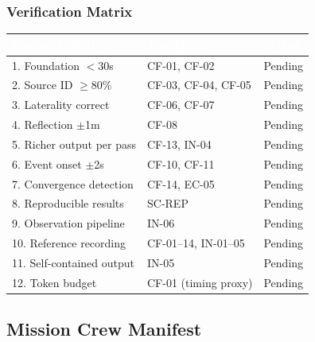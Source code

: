 \documentclass[11pt,letterpaper]{article}
\newcommand{\tableheader}[1]{\textbf{\sffamily\textcolor{white}{#1}}}
\begin{document}
\subsubsection{Verification Matrix}

\begin{center}
\begin{tabularx}{\textwidth}{XL{3.5cm}C{1.5cm}}
\toprule
{}
\tableheader{Success Criterion} & \tableheader{Test ID(s)} & \tableheader{Status} \\
. Foundation $<$30s & CF-01, CF-02 & Pending \\
2. Source ID $\geq$80\% & CF-03, CF-04, CF-05 & Pending \\
3. Laterality correct & CF-06, CF-07 & Pending \\
4. Reflection $\pm$1m & CF-08 & Pending \\
5. Richer output per pass & CF-13, IN-04 & Pending \\
6. Event onset $\pm$2s & CF-10, CF-11 & Pending \\
7. Convergence detection & CF-14, EC-05 & Pending \\
8. Reproducible results & SC-REP & Pending \\
9. Observation pipeline & IN-06 & Pending \\
10. Reference recording & CF-01--14, IN-01--05 & Pending \\
11. Self-contained output & IN-05 & Pending \\
12. Token budget & CF-01 (timing proxy) & Pending \\
\bottomrule
\end{tabularx}
\end{center}

\subsection{Mission Crew Manifest}
\end{document}
